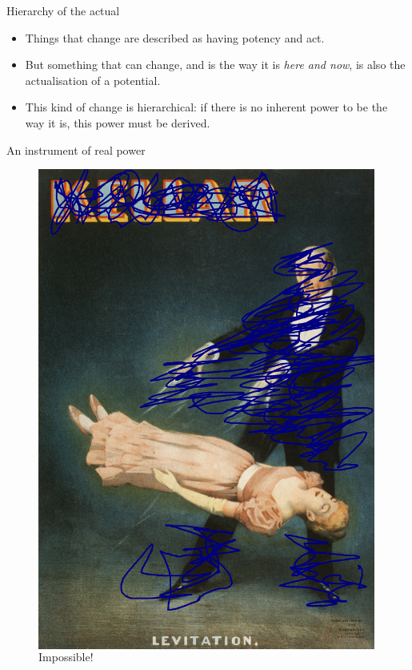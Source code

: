 \documentclass[xcolor=dvipsnames]{beamer}
\begin{document}
\begin{frame}[fragile]{Hierarchy of the actual}
  \begin{itemize}
  \item Things that change are described as having potency and act. \vspace{5mm}
  \item But something that can change, and is the way it is \emph{here and now}, is also the actualisation of a potential. \vspace{5mm}
    \item This kind of change is hierarchical: if there is no inherent power to be the way it is, this power must be derived.
  \end{itemize}
\end{frame}

\begin{frame}{An instrument of real power}
\begin{figure}
  \centering
  \begin{columns}
    \centering
    \caption {Impossible!}
    \includegraphics[width=0.99\textwidth]{levitation2}

\end{columns}
\end{figure}
\end{frame}
\end{document}
